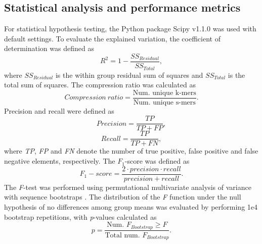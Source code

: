 \documentclass[10pt]{article}
\begin{document}
\subsection{Statistical analysis and performance metrics}
For statistical hypothesis testing, the Python package Scipy v1.1.0 was used with default settings. To evaluate the explained variation, the coefficient of determination was defined as
\begin{equation}
R^2=1-\frac{SS_{Residual}}{SS_{Total}},
\end{equation}
where \(SS_{Residual}\) is the within group residual sum of squares and \(SS_{Total}\) is the total sum of squares. The compression ratio was calculated as
\begin{equation}
Compression\: ratio = \frac{\textrm{Num. unique k-mers}}{\textrm{Num. unique s-mers}}.
\end{equation}
Precision and recall were defined as 
\begin{equation}
Precision = \frac{TP}{TP+FP},
\end{equation}
\begin{equation}
Recall = \frac{TP}{TP+FN},
\end{equation}
where \textit{TP}, \textit{FP} and \textit{FN} denote the number of true positive, false positive and false negative elements, respectively. The $F_1$-score was defined as 
\begin{equation}
F_1-score = \frac{2\cdot precision\cdot recall}{precision+recall}.
\end{equation}
The \textit{F}-test was performed using permutational multivariate analysis of variance with sequence bootstraps \cite{Anderson2001-zz,Zrimec2018-lx}. The distribution of the \textit{F} function under the null hypothesis of no differences among group means was evaluated by performing 1e4 bootstrap repetitions, with \textit{p}-values calculated as
\begin{equation}
p = \frac{\textrm{Num. }F_{Bootstrap}\geq F}{\textrm{Total num. }F_{Bootstrap}}.
\end{equation}
\end{document}
